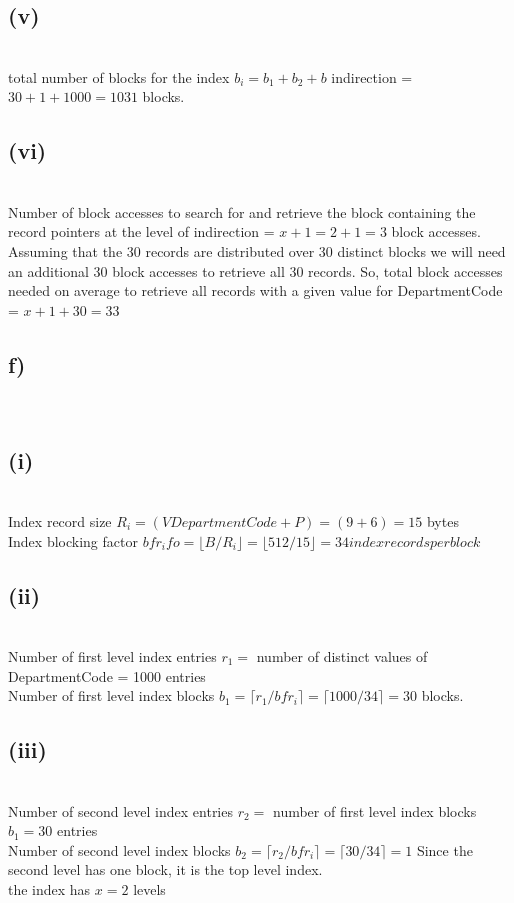 \documentclass[11pt]{article}
\theoremstyle{plain}
\theoremstyle{definition}
\begin{document}
\subsection*{(v)}\\
total number of blocks for the index $b_i =b_1+b_2+b$ indirection = $30+1+1000 = 1031$ blocks.\\
\subsection*{(vi)}\\
 Number of block accesses to search for and retrieve the block containing the record pointers at the level of indirection = $x + 1 = 2 + 1 = 3$ block accesses.\\
 Assuming that the 30 records are distributed over 30 distinct blocks we will need an additional 30 block accesses to retrieve all 30 records. So, total block accesses needed on average to retrieve all records with a given value for DepartmentCode = $x+1+30 = 33$\\
\subsection*{f)}\\

\subsection*{(i)}\\
Index record size $R_i = (V DepartmentCode + P) = (9+6) = 15$ bytes\\
Index blocking factor $bfr_ifo = \lfloor B/R_i \rfloor = \lfloor 512/15 \rfloor =34 index records per block$\\

\subsection*{(ii)}\\
Number of first level index entries $r_1 =$ number of distinct values of DepartmentCode = 1000 entries\\
Number of first level index blocks $b_1 = \lceil r_1 / bfr_i \rceil =\lceil 1000/34 \rceil= 30$ blocks.\\

\subsection*{(iii)}\\
Number of second level index entries $r_2 =$ number of first level index blocks $b_1 = 30$ entries\\
Number of second level index blocks $b_2 = \lceil r_2 / bfr_i \rceil =\lceil 30/34 \rceil= 1$ Since the second level has one block, it is the top level index.\\
the index has $ x = 2$ levels\\
\end{document}
